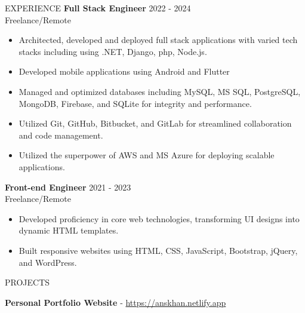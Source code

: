 \documentclass{resume} %
\begin{document}
\begin{rSection}{EXPERIENCE}
	\textbf{Full Stack Engineer} \hfill 2022 - 2024\\
	Freelance/Remote %
	\begin{itemize}
		\itemsep -3pt {} 
		\item Architected, developed and deployed full stack applications with varied tech stacks including using .NET, Django, php, Node.js.
		\item Developed mobile applications using Android and Flutter
		\item Managed and optimized databases including MySQL, MS SQL, PostgreSQL, MongoDB, Firebase, and SQLite for integrity and performance. 
		\item Utilized Git, GitHub, Bitbucket, and GitLab for streamlined collaboration and code management.
		\item Utilized the superpower of AWS and MS Azure for deploying scalable applications.
	\end{itemize}
	
	
	\textbf{Front-end Engineer} \hfill 2021  - 2023\\
	Freelance/Remote  \hfill %
	\begin{itemize}
		\itemsep -3pt {} 
		\item Developed proficiency in core web technologies, transforming UI designs into dynamic HTML templates.
		\item Built responsive websites using HTML, CSS, JavaScript, Bootstrap, jQuery, and WordPress. \\
		
	\end{itemize}
	
	
	

  
\begin{rSection}{PROJECTS}
\vspace{-1.25em}
\item \textbf{Personal Portfolio Website}  - \href{https://anskhan.netlify.app}{https://anskhan.netlify.app}




\end{rSection}
\end{rSection}
\end{document}
